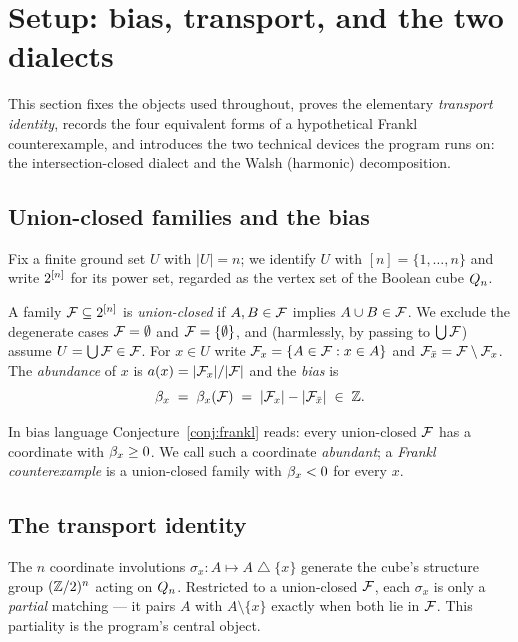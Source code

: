 \section{Setup: bias, transport, and the two dialects}
\label{sec:setup}

This section fixes the objects used throughout, proves the elementary
\emph{transport identity}, records the four equivalent forms of a
hypothetical Frankl counterexample, and introduces the two technical
devices the program runs on: the intersection-closed dialect and the
Walsh (harmonic) decomposition.

\subsection{Union-closed families and the bias}
\label{ssec:bias}

Fix a finite ground set $U$ with $|U|=n$; we identify $U$ with
$[n]=\{1,\dots,n\}$ and write $2^{[n]}$ for its power set, regarded as
the vertex set of the Boolean cube $Q_n$.

\begin{definition}
\label{def:uc-family}
A family $\mathcal{F}\subseteq2^{[n]}$ is \emph{union-closed} if $A,B\in\mathcal{F}$
implies $A\cup B\in\mathcal{F}$. We exclude the degenerate cases
$\mathcal{F}=\emptyset$ and $\mathcal{F}=\{\emptyset\}$, and (harmlessly, by passing to
$\bigcup\mathcal{F}$) assume $U=\bigcup\mathcal{F}\in\mathcal{F}$. For $x\in U$ write
$\mathcal{F}_x=\{A\in\mathcal{F}:x\in A\}$ and $\mathcal{F}_{\bar x}=\mathcal{F}\setminus\mathcal{F}_x$. The
\emph{abundance} of $x$ is $a(x)=|\mathcal{F}_x|/|\mathcal{F}|$ and the \emph{bias} is
\[
  \beta_x \;=\; \beta_x(\mathcal{F})\;=\;|\mathcal{F}_x|-|\mathcal{F}_{\bar x}|\;\in\;\mathbb{Z}.
\]
\end{definition}

In bias language Conjecture~\ref{conj:frankl} reads: every union-closed
$\mathcal{F}$ has a coordinate with $\beta_x\ge0$. We call such a coordinate
\emph{abundant}; a \emph{Frankl counterexample} is a union-closed
family with $\beta_x<0$ for every $x$.

\subsection{The transport identity}
\label{ssec:transport}

The $n$ coordinate involutions $\sigma_x\colon A\mapsto A\bigtriangleup
\{x\}$ generate the cube's structure group $(\mathbb{Z}/2)^n$ acting on
$Q_n$. Restricted to a union-closed $\mathcal{F}$, each $\sigma_x$ is only a
\emph{partial} matching --- it pairs $A$ with $A\setminus\{x\}$ exactly
when both lie in $\mathcal{F}$. This partiality is the program's central object.

